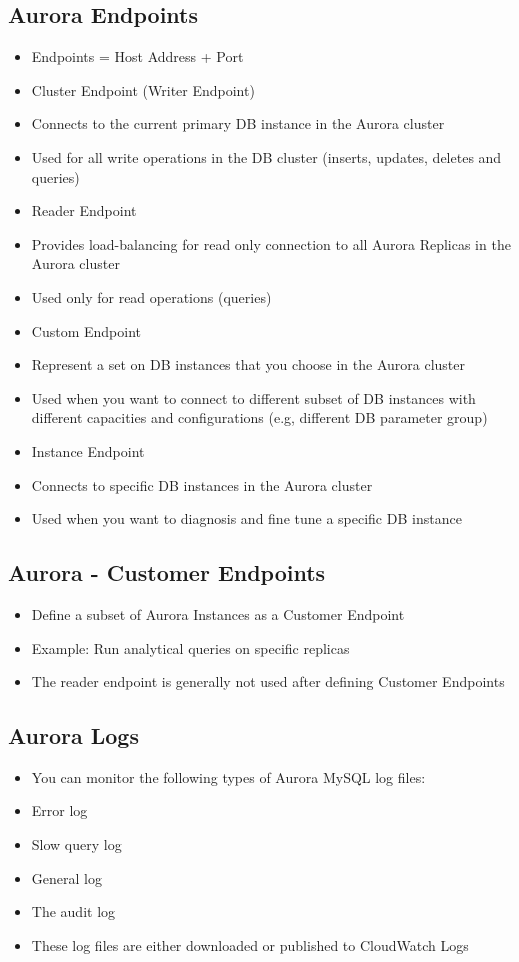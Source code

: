 \subsection{Aurora Endpoints}
\begin{itemize}
    \item Endpoints = Host Address + Port
    \item Cluster Endpoint (Writer Endpoint)
    \item Connects to the current primary DB instance in the Aurora cluster
    \item Used for all write operations in the DB cluster (inserts, updates, deletes and queries)
    \item Reader Endpoint
    \item Provides load-balancing for read only connection to all Aurora Replicas in the Aurora cluster
    \item Used only for read operations (queries)
    \item Custom Endpoint
    \item Represent a set on DB instances that you choose in the Aurora cluster
    \item Used when you want to connect to different subset of DB instances with different capacities and configurations (e.g, different DB parameter group)
    \item Instance Endpoint
    \item Connects to specific DB instances in the Aurora cluster
    \item Used when you want to diagnosis and fine tune a specific DB instance
\end{itemize}

\subsection{Aurora - Customer Endpoints}
\begin{itemize}
    \item Define a subset of Aurora Instances as a Customer Endpoint
    \item Example: Run analytical queries on specific replicas
    \item The reader endpoint is generally not used after defining Customer Endpoints
\end{itemize}

\subsection{Aurora Logs}
\begin{itemize}
    \item You can monitor the following types of Aurora MySQL log files:
    \item Error log
    \item Slow query log
    \item General log
    \item The audit log
    \item These log files are either downloaded or published to CloudWatch Logs
\end{itemize}

